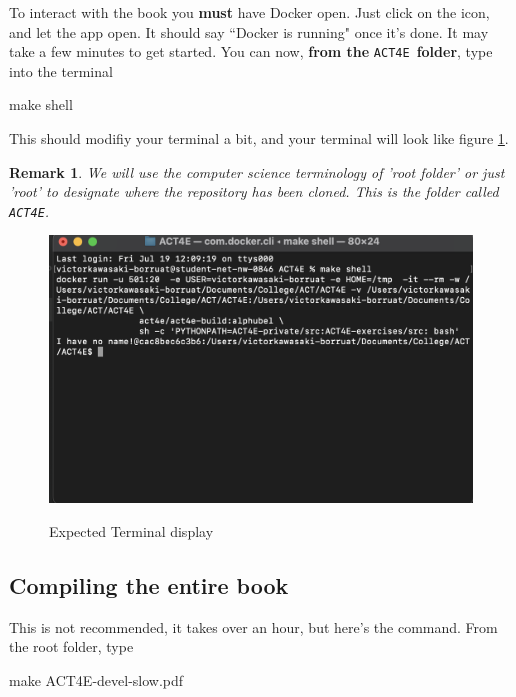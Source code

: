 \documentclass{article}
\newtheorem{remark}{Remark}
\begin{document}
To interact with the book you \textbf{must} have Docker open. Just click on the icon, and let the app open. It should say ``Docker is running" once it's done. It may take a few minutes to get started. You can now, \textbf{from the} \texttt{ACT4E} \textbf{folder}, type into the terminal
\begin{bashcode}
    make shell
\end{bashcode}
This should modifiy your terminal a bit, and your terminal will look like figure \ref{fig:enter-label}.
\begin{remark}
    We will use the computer science terminology of 'root folder' or just 'root' to designate where the repository has been cloned. This is the folder called \texttt{ACT4E}.
\end{remark}
\begin{figure}[ht]
    \centering
    \includegraphics[width=0.5\linewidth]{make-shell.png}
    \label{fig:enter-label}
    \caption{Expected Terminal display}
\end{figure}
\subsection{Compiling the entire book}
This is not recommended, it takes over an hour, but here's the command. From the root folder, type
\begin{bashcode}
    make ACT4E-devel-slow.pdf
\end{bashcode}
\end{document}
